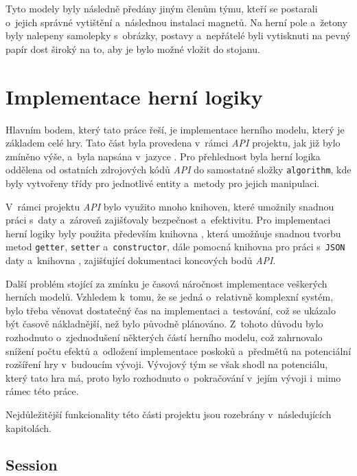 Tyto modely byly následně předány jiným členům týmu, kteří se postarali o~jejich správné vytištění a~následnou instalaci magnetů. Na herní pole a~žetony byly nalepeny samolepky s~obrázky, postavy a~nepřátelé byli vytisknuti na pevný papír dost široký na to, aby je bylo možné vložit do stojanu.

\section{Implementace herní logiky}
\label{sec:game_logic}

Hlavním bodem, který tato práce řeší, je implementace herního modelu, který je základem celé hry. Tato část byla provedena v~rámci \textit{API} projektu, jak již bylo zmíněno výše, a~byla napsána v~jazyce . Pro přehlednost byla herní logika oddělena od ostatních zdrojových kódů \textit{API} do samostatné složky \texttt{algorithm}, kde byly vytvořeny třídy pro jednotlivé entity a~metody pro jejich manipulaci.

V~rámci projektu \textit{API} bylo využito mnoho knihoven, které umožnily snadnou práci s~daty a~zároveň zajišťovaly bezpečnost a~efektivitu. Pro implementaci herní logiky byly použita především knihovna , která umožňuje snadnou tvorbu metod \texttt{getter}, \texttt{setter} a~\texttt{constructor}, dále pomocná knihovna  pro práci s~\texttt{JSON} daty a~knihovna , zajišťující dokumentaci koncových bodů \textit{API}.

Další problém stojící za zmínku je časová náročnost implementace veškerých herních modelů. Vzhledem k~tomu, že se jedná o~relativně komplexní systém, bylo třeba věnovat dostatečný čas na implementaci a~testování, což se ukázalo být časově nákladnější, než bylo původně plánováno. Z~tohoto důvodu bylo rozhodnuto o~zjednodušení některých částí herního modelu, což zahrnovalo snížení počtu efektů a~odložení implementace poskoků a~předmětů na potenciální rozšíření hry v~budoucím vývoji. Vývojový tým se však shodl na potenciálu, který tato hra má, proto bylo rozhodnuto o~pokračování v~jejím vývoji i~mimo rámec této práce.

Nejdůležitější funkcionality této části projektu jsou rozebrány v~následujících kapitolách.

\subsection{Session}
\label{subsec:impl_session}

